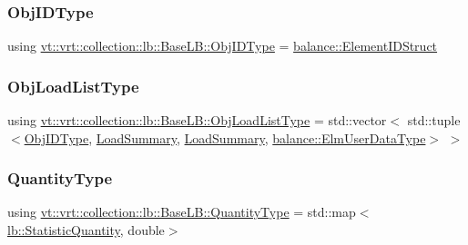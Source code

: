\subsubsection{\texorpdfstring{Obj\+I\+D\+Type}{ObjIDType}}
{\footnotesize\ttfamily using \hyperlink{structvt_1_1vrt_1_1collection_1_1lb_1_1_base_l_b_a790b22acf448880599724749cdc4e9b3}{vt\+::vrt\+::collection\+::lb\+::\+Base\+L\+B\+::\+Obj\+I\+D\+Type} =  \hyperlink{namespacevt_1_1vrt_1_1collection_1_1balance_a9f5b53fafb270212279a4757d2c4cd28}{balance\+::\+Element\+I\+D\+Struct}}

\mbox{\label{structvt_1_1vrt_1_1collection_1_1lb_1_1_base_l_b_ae16d5f0fe9078684bc8e4a4b86ce3a0c}} 
\subsubsection{\texorpdfstring{Obj\+Load\+List\+Type}{ObjLoadListType}}
{\footnotesize\ttfamily using \hyperlink{structvt_1_1vrt_1_1collection_1_1lb_1_1_base_l_b_ae16d5f0fe9078684bc8e4a4b86ce3a0c}{vt\+::vrt\+::collection\+::lb\+::\+Base\+L\+B\+::\+Obj\+Load\+List\+Type} =  std\+::vector$<$ std\+::tuple$<$\hyperlink{structvt_1_1vrt_1_1collection_1_1lb_1_1_base_l_b_a790b22acf448880599724749cdc4e9b3}{Obj\+I\+D\+Type}, \hyperlink{structvt_1_1vrt_1_1collection_1_1lb_1_1_base_l_b_aa78583f362acc50fcca87d4ce3150151}{Load\+Summary}, \hyperlink{structvt_1_1vrt_1_1collection_1_1lb_1_1_base_l_b_aa78583f362acc50fcca87d4ce3150151}{Load\+Summary}, \hyperlink{namespacevt_1_1vrt_1_1collection_1_1balance_abf9eea0f4c24e41036ab844025e7d4c8}{balance\+::\+Elm\+User\+Data\+Type}$>$ $>$}

\mbox{\label{structvt_1_1vrt_1_1collection_1_1lb_1_1_base_l_b_a864b2c437d81680577013741e265ef0d}} 
\subsubsection{\texorpdfstring{Quantity\+Type}{QuantityType}}
{\footnotesize\ttfamily using \hyperlink{structvt_1_1vrt_1_1collection_1_1lb_1_1_base_l_b_a864b2c437d81680577013741e265ef0d}{vt\+::vrt\+::collection\+::lb\+::\+Base\+L\+B\+::\+Quantity\+Type} =  std\+::map$<$\hyperlink{namespacevt_1_1vrt_1_1collection_1_1lb_a74989c7b4dd16fcc067e90a29cd1febe}{lb\+::\+Statistic\+Quantity}, double$>$}


